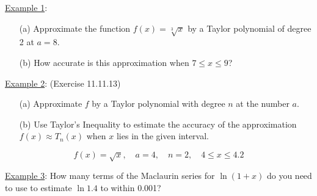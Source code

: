 \documentclass[paper=a4, fontsize=11pt]{scrartcl} %
\numberwithin{equation}{section} %
\numberwithin{figure}{section} %
\numberwithin{table}{section} %
\newcommand{\ds}{\displaystyle}
\begin{document}
\underline{Example 1}:
\begin{enumerate}
\item[(a)] Approximate the function $f(x)=\ds\sqrt[3]{x}$ by a Taylor polynomial of degree 2 at $a=8$.
\item[(b)] How accurate is this approximation when $7\leq x \leq 9$?
\end{enumerate}

\newpage

\underline{Example 2}: (Exercise 11.11.13)
\begin{enumerate}
\item[(a)] Approximate $f$ by a Taylor polynomial with degree $n$ at the number $a$.\\
\item[(b)] Use Taylor's Inequality to estimate the accuracy of the approximation $f(x)\approx T_n(x)$ when $x$ lies in the given interval.
\end{enumerate}
\[f(x) = \sqrt{x}, \quad a=4, \quad n=2, \quad 4\leq x \leq 4.2\]

\newpage

\underline{Example 3}: How many terms of the Maclaurin series for $\ln(1+x)$ do you need to use to estimate $\ln 1.4$ to within 0.001?\\
\indent


\end{document}

